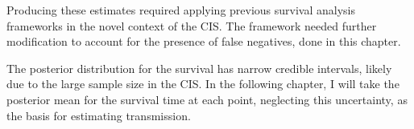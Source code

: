 \documentclass[thesis.tex]{subfiles}
\begin{document}
Producing these estimates required applying previous survival analysis frameworks in the novel context of the CIS.
The framework needed further modification to account for the presence of false negatives, done in this chapter.

The posterior distribution for the survival has narrow credible intervals, likely due to the large sample size in the CIS.
In the following chapter, I will take the posterior mean for the survival time at each point, neglecting this uncertainty, as the basis for estimating transmission.

\ifSubfilesClassLoaded{
  \listoftodos
}{}
\end{document}

